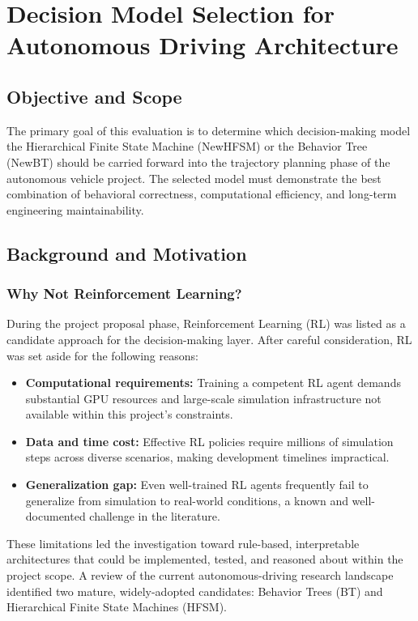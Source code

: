 \documentclass[12pt, a4paper]{report}
\begin{document}
\section{Decision Model Selection for Autonomous Driving Architecture}

\subsection{Objective and Scope}

The primary goal of this evaluation is to determine which decision-making model the Hierarchical Finite State Machine (NewHFSM) or the Behavior Tree (NewBT) should be carried forward into the trajectory planning phase of the autonomous vehicle project. The selected model must demonstrate the best combination of behavioral correctness, computational efficiency, and long-term engineering maintainability.

\subsection{Background and Motivation}

\subsubsection{Why Not Reinforcement Learning?}

During the project proposal phase, Reinforcement Learning (RL) was listed as a candidate approach for the decision-making layer. After careful consideration, RL was set aside for the following reasons:

\begin{itemize}
    \item \textbf{Computational requirements:} Training a competent RL agent demands substantial GPU resources and large-scale simulation infrastructure not available within this project's constraints.
    \item \textbf{Data and time cost:} Effective RL policies require millions of simulation steps across diverse scenarios, making development timelines impractical.
    \item \textbf{Generalization gap:} Even well-trained RL agents frequently fail to generalize from simulation to real-world conditions, a known and well-documented challenge in the literature.
\end{itemize}

These limitations led the investigation toward rule-based, interpretable architectures that could be implemented, tested, and reasoned about within the project scope. A review of the current autonomous-driving research landscape identified two mature, widely-adopted candidates: Behavior Trees (BT) and Hierarchical Finite State Machines (HFSM).
\end{document}
